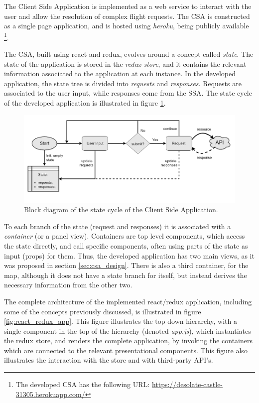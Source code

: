 The Client Side Application is implemented as a web service to interact with the user and allow the resolution of complex flight requests. The CSA is constructed as a single page application, and is hosted using \textit{heroku}, being publicly available \footnote{The developed CSA has the following URL: \url{https://desolate-castle-31305.herokuapp.com/}}.

The CSA, built using react and redux, evolves around a concept called \textit{state}. The state of the application is stored in the \textit{redux store}, and it contains the relevant information associated to the application at each instance. In the developed application, the state tree is  divided into \textit{requests} and \textit{responses}. Requests are associated to the user input, while responses come from the SSA. The state cycle of the developed application is illustrated in figure \ref{fig:app_state_cycle}.

\begin{figure}[htpb]
  \centering
  \includegraphics[width=\textwidth]{./Figures/system_implementation/state_flow.png}
  \caption{Block diagram of the state cycle of the Client Side Application.}
  \label{fig:app_state_cycle}  
\end{figure}

To each branch of the state (request and responses) it is associated with a \textit{container} (or a panel view). Containers are top level components, which access the state directly, and call specific components, often using parts of the state as input (props) for them. Thus, the developed application has two main views, as it was proposed in section \ref{sec:csa_design}. There is also a third container, for the map, although it does not have a state branch for itself, but instead derives the necessary information from the other two. 

The complete architecture of the implemented react/redux application, including some of the concepts previously discussed, is illustrated in figure \ref{fig:react_redux_app}. This figure illustrates the top down hierarchy, with a single component in the top of the hierarchy (denoted \textit{app.js}), which instantiates the redux store, and renders the complete application, by invoking the containers which are connected to the relevant presentational components. This figure also illustrates the interaction with the store and with third-party API's. 

